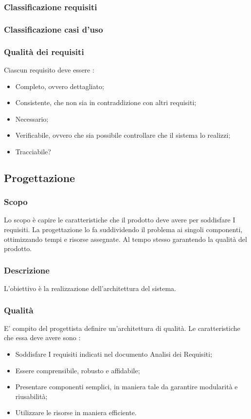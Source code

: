 \subsubsection{Classificazione requisiti}

\subsubsection{Classificazione casi d'uso}

\subsubsection{Qualità dei requisiti}
Ciascun requisito deve essere :
\begin{itemize}
  \item Completo, ovvero dettagliato;
  \item Consistente, che non sia in contraddizione con altri requisiti;
  \item Necessario;
  \item Verificabile, ovvero che sia possibile controllare che il sistema lo realizzi;
  \item Tracciabile?
\end{itemize}

\subsection{Progettazione}
\subsubsection{Scopo}
Lo scopo è capire le caratteristiche che il prodotto deve avere per soddisfare I requisiti. La progettazione lo fa suddividendo il problema ai singoli componenti, ottimizzando tempi e risorse assegnate. Al tempo stesso garantendo la qualità del prodotto.

\subsubsection{Descrizione}
L’obiettivo è la realizzazione dell’architettura del sistema.

\subsubsection{Qualità}
E’ compito del progettista definire un’architettura di qualità. Le caratteristiche che essa deve avere sono :
\begin{itemize}
  \item Soddisfare I requisiti indicati nel documento Analisi dei Requisiti;
  \item Essere comprensibile, robusto e affidabile;
  \item Presentare componenti semplici, in maniera tale da garantire modularità e riusabilità;
  \item Utilizzare le risorse in maniera efficiente.
\end{itemize}


